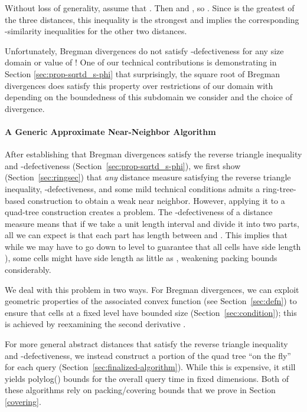 \documentclass[11pt]{myclass}
\begin{document}
Without loss of generality, assume that .  Then  and , 
so . Since  is the greatest of the three distances, this inequality is the strongest and implies 
the corresponding -similarity inequalities for the other two distances.

Unfortunately, Bregman divergences do not satisfy -defectiveness for any size domain or value of ! One of our
technical contributions is demonstrating in Section \ref{sec:prop-sqrtd_s-phi} that surprisingly, the square root of Bregman divergences
does satisfy this property over restrictions of our domain with  depending on the boundedness of this subdomain we consider and the choice of divergence.

\paragraph{A Generic Approximate Near-Neighbor Algorithm}

After establishing that Bregman divergences satisfy the reverse triangle inequality and -defectiveness (Section~\ref{sec:prop-sqrtd_s-phi}),
 we first show (Section~\ref{sec:ringsec}) that \emph{any} distance measure satisfying 
the reverse triangle inequality, -defectiveness, and some mild technical conditions admits a ring-tree-based construction 
to obtain a weak near neighbor. However, applying it to a quad-tree construction creates a problem. 
The -defectiveness of a distance measure means that if we take a unit length interval and divide it into two parts, 
all we can expect is that each part has length between  and . This implies that while we may have 
to go down to level  to guarantee that all cells have side length ), some cells 
might have side length as little as , weakening packing bounds considerably. 

We deal with this problem in two ways. For Bregman divergences, we can exploit geometric properties of the 
associated convex function  (see Section~\ref{sec:defn}) to ensure that cells at a fixed level have bounded
size (Section~\ref{sec:condition}); this is achieved by reexamining the second derivative . 

For more general abstract distances that satisfy the reverse triangle inequality and -defectiveness,
 we instead construct a portion of the quad tree ``on the fly'' for each query (Section~\ref{sec:finalized-algorithm}).
 While this is expensive, it still yields polylog() bounds for the overall query time in fixed dimensions. 
Both of these algorithms rely on packing/covering bounds that we prove in Section \ref{covering}. 
\end{document}
